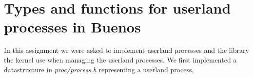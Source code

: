 \documentclass[11pt]{article}
\begin{document}

    \clearpage
    \maketitle
    \thispagestyle{empty}

    \newpage




    \section{Types and functions for userland processes in Buenos}
    In this assignment we were asked to implement userland processes and the
    library the kernel use when managing the userland processes.  We first
    implemented a datastructure in \textit{proc/process.h} representing a
    userland process.
\end{document}
